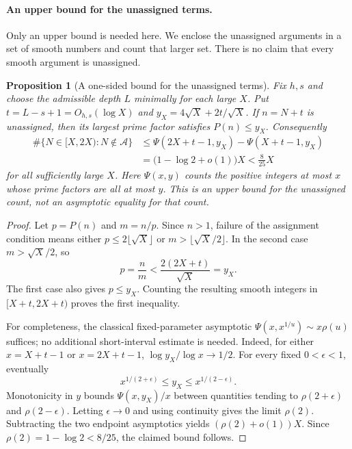 \documentclass[11pt]{article}
\theoremstyle{plain}
\newtheorem{prop}[thm]{Proposition}
\theoremstyle{definition}
\theoremstyle{remark}
\begin{document}
\paragraph{An upper bound for the unassigned terms.}
Only an upper bound is needed here. We enclose the unassigned
arguments in a set of smooth numbers and count that larger set.
There is no claim that every smooth argument is unassigned.

\begin{prop}[A one-sided bound for the unassigned terms]\label{prop:dickman}
Fix $h,s$ and choose the admissible depth $L$ minimally for each large $X$.
Put $t=L-s+1=O_{h,s}(\log X)$ and $y_X=4\sqrt X+2t/\sqrt X$.
If $n=N+t$ is unassigned, then its largest prime factor satisfies
$P(n)\le y_X$. Consequently
\[
\begin{aligned}
 \#\{N\in[X,2X):N\notin\mathcal A\}
 &\le \Psi(2X+t-1,y_X)-\Psi(X+t-1,y_X)\\
 &=\bigl(1-\log2+o(1)\bigr)X<\tfrac8{25}X
\end{aligned}
\]
for all sufficiently large $X$. Here $\Psi(x,y)$ counts the positive
integers at most $x$ whose prime factors are all at most $y$.
This is an upper bound for the unassigned count, not an asymptotic equality
for that count.
\end{prop}

\begin{proof}
Let $p=P(n)$ and $m=n/p$. Since $n>1$, failure of the assignment condition
means either $p\le2\lfloor\sqrt X\rfloor$ or
$m>\lfloor\sqrt X/2\rfloor$. In the second case $m>\sqrt X/2$, so
\[
 p=\frac{n}{m}<\frac{2(2X+t)}{\sqrt X}=y_X.
\]
The first case also gives $p\le y_X$. Counting the resulting smooth
integers in $[X+t,2X+t)$ proves the first inequality.

For completeness, the classical fixed-parameter asymptotic
$\Psi(x,x^{1/u})\sim x\rho(u)$ suffices; no additional short-interval
estimate is needed. Indeed, for either $x=X+t-1$ or $x=2X+t-1$,
$\log y_X/\log x\to1/2$. For every fixed $0<\epsilon<1$, eventually
\[
 x^{1/(2+\epsilon)}\le y_X\le x^{1/(2-\epsilon)}.
\]
Monotonicity in $y$ bounds $\Psi(x,y_X)/x$ between quantities tending to
$\rho(2+\epsilon)$ and $\rho(2-\epsilon)$. Letting $\epsilon\to0$ and
using continuity gives the limit $\rho(2)$. Subtracting the two endpoint
asymptotics yields $(\rho(2)+o(1))X$. Since $\rho(2)=1-\log2<8/25$,
the claimed bound follows.
\end{proof}
\end{document}
